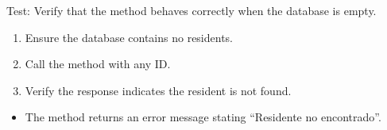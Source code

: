 \documentclass[letterpaper,10pt,english]{sphinxmanual}
\begin{document}
\begin{fulllineitems}
\label{\detokenize{test:test.test_residetnt.test_get_resident_by_id_empty_database}}
\pysigstartsignatures
\pysiglinewithargsret
{}
{}
{}
\pysigstopsignatures
\sphinxAtStartPar
Test: Verify that the method behaves correctly when the database is empty.
\begin{description}
\begin{enumerate}
%
\item {} 
\sphinxAtStartPar
Ensure the database contains no residents.

\item {} 
\sphinxAtStartPar
Call the  method with any ID.

\item {} 
\sphinxAtStartPar
Verify the response indicates the resident is not found.

\end{enumerate}

\begin{itemize}
\item {} 
\sphinxAtStartPar
The method returns an error message stating “Residente no encontrado”.

\end{itemize}

\end{description}

\end{fulllineitems}

\end{document}
